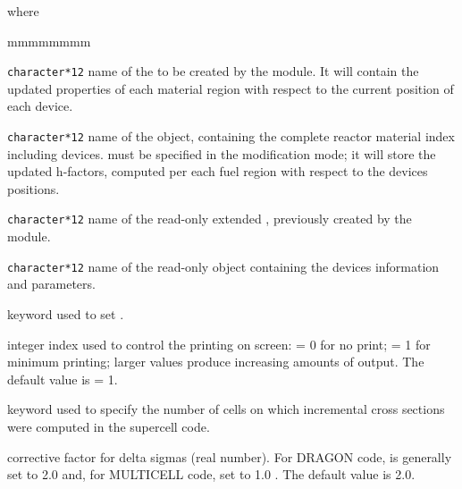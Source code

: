 \noindent where
\begin{ListeDeDescription}{mmmmmmmm}

\item[\dusa{MACRO3}] \texttt{character*12} name of the 
to be created by the module. It will contain the updated properties of each
material region with respect to the current position of each device.

\item[\dusa{MATEX}] \texttt{character*12} name of the  object,
containing the complete reactor material index including devices. 
must be specified in the modification mode; it will store the updated h-factors,
computed per each fuel region with respect to the devices positions.

\item[\dusa{MACRO2}] \texttt{character*12} name of the read-only extended
, previously created by the  module.

\item[\dusa{DEVICE}] \texttt{character*12} name of the read-only
 object containing the devices information and parameters.

\item[\moc{EDIT}] keyword used to set .

\item[\dusa{iprint}] integer index used to control the printing on screen: = 0
for no print; = 1 for minimum printing; larger values produce increasing amounts
of output. The default value is  = 1.

\item[\moc{XFAC}] keyword used to specify the number of cells on which incremental cross sections were computed 
in the supercell code.

\item[\dusa{xfac}] corrective factor for delta sigmas (real number). For DRAGON code,  is generally set to 2.0 and, for MULTICELL 
code, set to 1.0 . The default value is 2.0. 

\end{ListeDeDescription}
\clearpage
